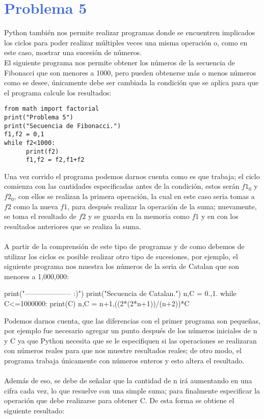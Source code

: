 \documentclass[12pt]{article}
\begin{document}
 \section*{\textcolor{RoyalBlue}{Problema 5}}
 Python también nos permite realizar programas donde se encuentren implicados los ciclos para poder realizar múltiples veces una misma operación o, como en este caso, mostrar una sucesión de números.\\
 El siguiente programa nos permite obtener los números de la secuencia de Fibonacci que son menores a 1000, pero pueden obtenerse más o menos números como se desee, únicamente debe ser cambiada la condición que se aplica para que el programa calcule los resultados:
\begin{verbatim}
from math import factorial
print("Problema 5")
print("Secuencia de Fibonacci.")
f1,f2 = 0,1
while f2<1000:
      print(f2)
      f1,f2 = f2,f1+f2  
\end{verbatim}

Una vez corrido el programa podemos darnos cuenta como es que trabaja; el ciclo comienza con las cantidades especificadas antes de la condición, estos serán $f1_0$ y $f2_0$, con ellos se realizan la primera operación, la cual en este caso seria tomas a $f2$ como la nueva $f1$, para después realizar la operación de la suma; nuevamente, se toma el resultado de $f2$ y se guarda en la memoria como $f1$ y en con los resultados anteriores que se realiza la suma.\\
\\ 
A partir de la comprensión de este tipo de programas y de como debemos de utilizar los ciclos es posible realizar otro tipo de sucesiones, por ejemplo, el siguiente programa nos muestra los números de la seria de Catalan que son menores a 1,000,000:
\begin{center}
\begin{boxedverbatim} 
print("-------------------- :)")
print("Secuencia de Catalan.")
n,C = 0.,1.
while C<=1000000:
    print(C) 
    n,C = n+1,((2*(2*n+1))/(n+2))*C
\end{boxedverbatim}
\end{center}
Podemos darnos cuenta, que las diferencias con el primer programa son pequeñas, por ejemplo fue necesario agregar un punto después de los números iniciales de n y C ya que Python necesita que se le especifiquen si las operaciones se realizaran con números reales para que nos muestre resultados reales; de otro modo, el programa trabaja únicamente con números enteros y esto altera el resultado.\\
\\
Además de eso, se debe de señalar que la cantidad de n irá aumentando en una cifra cada vez, lo que resuelve con una simple suma; para finalmente especificar la operación que debe realizarse para obtener C. De esta forma se obtiene el siguiente resultado:
\end{document}
